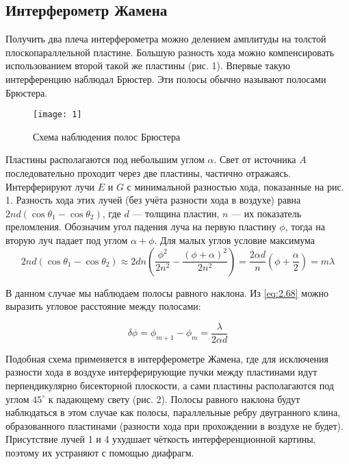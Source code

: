 \documentclass[a4paper, 12pt]{article}
\begin{document}
\subsection*{Интерферометр Жамена}

Получить два плеча интерферометра можно делением амплитуды на толстой
плоскопараллельной пластине. Большую разность хода можно
компенсировать использованием второй такой же пластины (рис. 1).
Впервые такую интерференцию наблюдал Брюстер. Эти полосы обычно
называют полосами Брюстера. 


\begin{figure}[H]
    \texttt{[image: 1]} 
    \captionsetup{justification=centering}
    \caption{Схема наблюдения полос Брюстера}
\end{figure}

Пластины располагаются под небольшим углом $\alpha$. Свет от источника
$A$ 
последовательно проходит через две пластины, частично отражаясь.
Интерферируют лучи $E$ и $G$ с минимальной разностью хода, показанные на
рис. 1. Разность хода этих лучей (без учёта разности хода в
воздухе) равна $2nd(\cos\theta_1-\cos\theta_2)$, где $d$ — толщина
пластин, $n$ — их
показатель преломления. Обозначим угол падения луча на первую пластину
$\phi$, тогда на вторую луч падает под углом $\alpha+\phi$. Для малых углов условие
максимума 
\begin{equation}
    2nd(\cos\theta_1-\cos\theta_2) \approx 2dn\left(
        \frac{\phi^2}{2n^2} - \frac{(\phi+\alpha)^2}{2n^2} \right) =
        \frac{2\alpha d}{n}\left(\phi + \frac{\alpha}{2}  \right) =
        m\lambda
        \label{eq:2.68}
\end{equation}

В данном случае мы наблюдаем полосы равного наклона. Из \eqref{eq:2.68}
можно выразить угловое расстояние между полосами:

\[
    \delta \phi = \phi_{m+1} - \phi_m = \frac{\lambda}{2\alpha d}
\]

Подобная схема применяется в интерферометре Жамена, где для исключения
разности хода в воздухе интерферирующие пучки между пластинами идут
перпендикулярно бисекторной плоскости, а сами пластины располагаются
под углом $45^\circ$ к падающему свету (рис. 2). Полосы равного наклона
будут наблюдаться в этом случае как полосы, параллельные ребру
двугранного клина, образованного пластинами (разности хода при
прохождении в воздухе не будет). Присутствие лучей 1 и 4 ухудшает
чёткость интерференционной картины, поэтому их устраняют с помощью
диафрагм.
\end{document}
